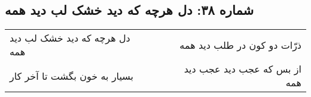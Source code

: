 \begin{center}
\section*{شماره ۳۸: دل هرچه که دید خشک لب دید همه}
\label{sec:038}
\begin{longtable}{l p{0.5cm} r}
دل هرچه که دید خشک لب دید همه
&&
ذرّات دو کون در طلب دید همه
\\
بسیار به خون بگشت تا آخر کار
&&
از بس که عجب دید عجب دید همه
\\
\end{longtable}
\end{center}
